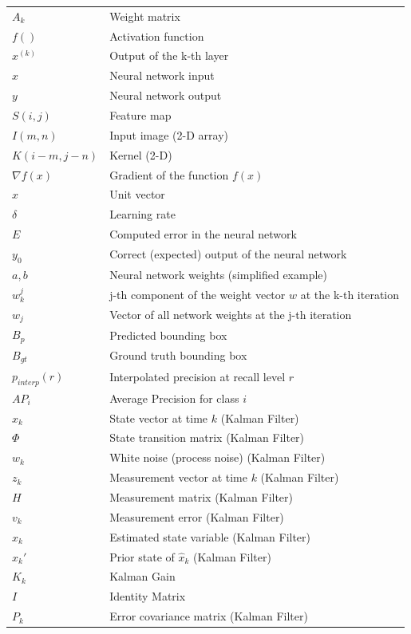\begin{longtable}{ll}
$A_k$ & Weight matrix \\
$f()$ & Activation function \\
$x^{(k)}$ & Output of the k-th layer \\
$x$ & Neural network input \\
$y$ & Neural network output \\
$S(i,j)$ & Feature map \\
$I(m,n)$ & Input image (2-D array) \\
$K(i-m,j-n)$ & Kernel (2-D) \\
$\nabla f(x)$ & Gradient of the function $f(x)$ \\
$\hat{x}$ & Unit vector \\
$\delta$ & Learning rate\\
$E$ & Computed error in the neural network \\
$y_0$ & Correct (expected) output of the neural network \\
$a, b$ & Neural network weights (simplified example) \\
$w_k^j$ & j-th component of the weight vector $w$ at the k-th iteration \\
$w_j$ & Vector of all network weights at the j-th iteration \\
$B_p$ & Predicted bounding box \\
$B_{gt}$ & Ground truth bounding box \\
$p_{interp}(r)$ & Interpolated precision at recall level $r$ \\
$AP_i$ & Average Precision for class $i$ \\
$x_k$ & State vector at time $k$ (Kalman Filter) \\
$\Phi$ & State transition matrix (Kalman Filter) \\
$w_k$ & White noise (process noise) (Kalman Filter) \\
$z_k$ & Measurement vector at time $k$ (Kalman Filter) \\
$H$ & Measurement matrix (Kalman Filter) \\
$v_k$ & Measurement error (Kalman Filter) \\
$\hat{x}_k$ & Estimated state variable (Kalman Filter) \\
$\hat{x}_k'$ & Prior state of $\hat{x}_k$ (Kalman Filter) \\
$K_k$ & Kalman Gain \\
$I$ & Identity Matrix \\
$P_k$ & Error covariance matrix (Kalman Filter) \\

\end{longtable}

